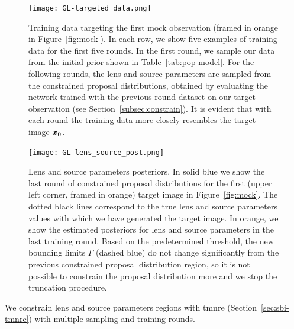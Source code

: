 \begin{figure}
\centering
\texttt{[image: GL-targeted\_data.png]}
\caption{Training data targeting the first mock observation (framed in orange in Figure~\ref{fig:mock}). In each row, we show five examples of training data for the first five rounds. In the first round, we sample our data from the initial prior shown in Table~\ref{tab:pop-model}. For the following rounds, the lens and source parameters are sampled from the constrained proposal distributions, obtained by evaluating the network trained with the previous round dataset on our target observation (see Section~\ref{subsec:constrain}). It is evident that with each round the training data more closely resembles the target image $\bm{x}_0$.
}
\label{fig:targeted_data}
\end{figure}

\begin{figure}
\centering
\texttt{[image: GL-lens\_source\_post.png]}
\caption{Lens and source parameters posteriors. In solid blue we show the last round of constrained proposal distributions for the first (upper left corner, framed in orange) target image in Figure~\ref{fig:mock}. The dotted black lines correspond to the true lens and source parameters values with which we have generated the target image. In orange, we show the estimated posteriors for lens and source parameters in the last training round. Based on the predetermined threshold, the new bounding limits $\Gamma$ (dashed blue) do not change significantly from the previous constrained proposal distribution region, so it is not possible to constrain the proposal distribution more and we stop the truncation procedure.
}
\label{fig:lens_source_post}
\end{figure}

We constrain lens and source parameters regions with \gls*{tmnre} (Section~\ref{sec:sbi-tmnre}) with multiple sampling and training rounds.

